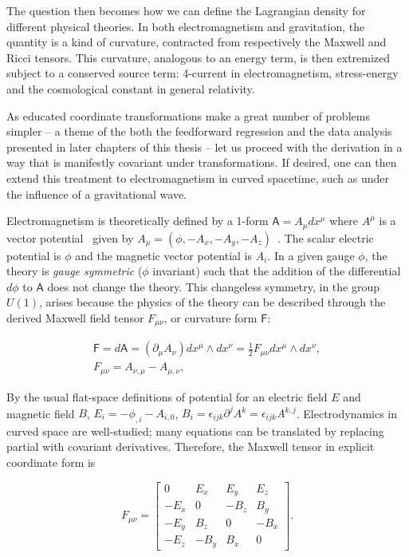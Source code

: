 The question then becomes how we can define the Lagrangian density for different physical theories. 
In both electromagnetism and gravitation, the quantity is a kind of curvature, contracted from respectively the Maxwell and Ricci tensors. 
This curvature, analogous to an energy term, is then extremized subject to a conserved source term: 4-current in electromagnetism, stress-energy and the cosmological constant in general relativity.

As educated coordinate transformations make a great number of problems simpler -- a theme of the both the feedforward regression and the data analysis presented in later chapters of this thesis -- let us proceed with the derivation in a way that is manifestly covariant under transformations. If desired, one can then extend this treatment to electromagnetism in curved spacetime, such as under the influence of a gravitational wave. 

    Electromagnetism is theoretically defined by a 1-form $\textsf{A} = A_\mu d x^\mu$ where $A^\mu$ is a vector potential~\cite{MisnerThorneWheeler} given by $A_\mu = (\phi, -A_x, -A_y, -A_z)$~\cite{GriffithsE}. 
The scalar electric potential is $\phi$ and the magnetic vector potential is $A_i$.
In a given gauge $\phi$, the theory is \textit{gauge symmetric} ($\phi$ invariant) such that the addition of the differential $d \phi$ to $\textsf{A}$ does not change the theory. 
This changeless symmetry, in the group $U(1)$, arises because the physics of the theory can be described through the derived Maxwell field tensor $F_{\mu \nu}$, or curvature form $\textsf{F}$:

\begin{eqnarray}
\textsf{F} = d \textsf{A} = (\partial_\mu A_\nu) dx^\mu \wedge dx^\nu = \frac{1}{2} F_{\mu\nu} dx^\mu \wedge dx^\nu, \\
F_{\mu \nu} = A_{\nu,\mu} - A_{\mu,\nu},
\end{eqnarray}

By the usual flat-space definitions of potential for an electric field $E$ and magnetic field $B$, $E_i = -\phi_{,i} - A_{i,0}$, $B_i = \epsilon_{ijk} \partial^j A^k = \epsilon_{ijk} A^{k, j}$. 
Electrodynamics in curved space are well-studied; many equations can be translated by replacing partial with covariant derivatives.
Therefore, the Maxwell tensor in explicit coordinate form is

\begin{equation}
F_{\mu\nu} =
\left[
\begin{array}{cccc}
0 & E_x & E_y & E_z\\
-E_x & 0 & -B_z & B_y \\
-E_y & B_z & 0 & -B_x\\
-E_z & -B_y & B_x & 0
\end{array} \right].
\end{equation}

